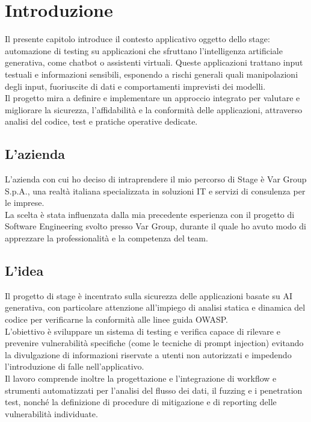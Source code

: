 \chapter{Introduzione}
\label{cap:introduzione}

Il presente capitolo introduce il contesto applicativo oggetto dello stage: automazione di testing su applicazioni che sfruttano l'intelligenza artificiale generativa, come chatbot o assistenti virtuali. Queste applicazioni trattano input testuali e informazioni sensibili, esponendo a rischi generali quali manipolazioni degli input, fuoriuscite di dati e comportamenti imprevisti dei modelli.\\
Il progetto mira a definire e implementare un approccio integrato per valutare e migliorare la sicurezza, l'affidabilità e la conformità delle applicazioni, attraverso analisi del codice, test e pratiche operative dedicate.\\



\section{L'azienda}
L'azienda con cui ho deciso di intraprendere il mio percorso di Stage è Var Group S.p.A., 
una realtà italiana specializzata in soluzioni IT e servizi di consulenza per le imprese.\\
La scelta è stata influenzata dalla mia precedente esperienza con il progetto di Software Engineering svolto presso Var Group,
durante il quale ho avuto modo di apprezzare la professionalità e la competenza del team.

\section{L'idea}
Il progetto di stage è incentrato sulla sicurezza delle applicazioni basate su AI generativa, con particolare attenzione all'impiego di analisi statica e dinamica del codice per verificarne la conformità alle linee guida OWASP. \\
L'obiettivo è sviluppare un sistema di testing e verifica capace di rilevare e prevenire vulnerabilità specifiche (come le tecniche di prompt injection) evitando la divulgazione di informazioni riservate a utenti non autorizzati e impedendo l'introduzione di falle nell'applicativo.\\
Il lavoro comprende inoltre la progettazione e l'integrazione di workflow e strumenti automatizzati per l'analisi del flusso dei dati, il fuzzing e i penetration test, nonché la definizione di procedure di mitigazione e di reporting delle vulnerabilità individuate.


